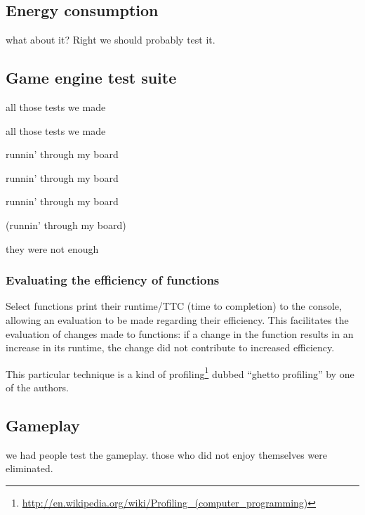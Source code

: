 \subsection{Energy consumption}
	what about it? Right we should probably test it.

\subsection{Game engine test suite}
	all those tests we made

	all those tests we made

	runnin' through my board

	runnin' through my board

	runnin' through my board

	(runnin' through my board)

	they were not enough
	\subsubsection{Evaluating the efficiency of functions}
		Select functions print their runtime/TTC (time to completion) to the console, allowing an evaluation to be made regarding their efficiency.
		This facilitates the evaluation of changes made to functions: if a change in the function results in an increase in its runtime, the change did not contribute to increased efficiency.

		This particular technique is a kind of profiling\footnote{\url{http://en.wikipedia.org/wiki/Profiling_(computer_programming)}} dubbed ``ghetto profiling'' by one of the authors. 

\subsection{Gameplay}
	we had people test the gameplay.
	those who did not enjoy themselves were eliminated.
